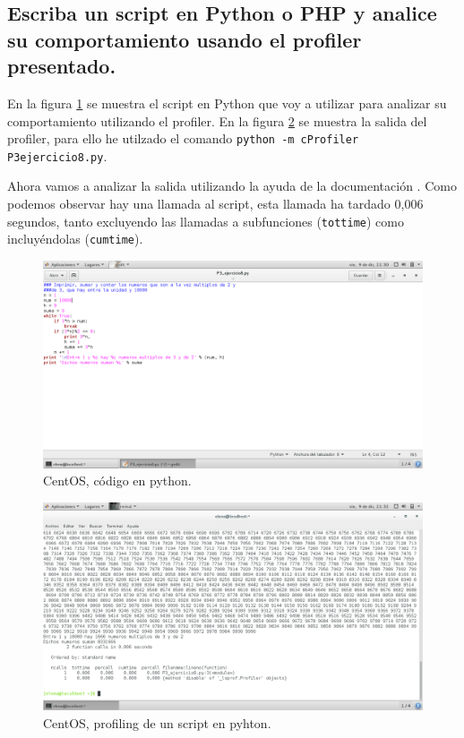\subsection{Escriba un script en Python o PHP y analice su comportamiento usando el profiler presentado.}

En la figura \ref{fig:ejercicio8_1} se muestra el script en Python que voy a utilizar para analizar su comportamiento utilizando el profiler. En la figura \ref{fig:ejercicio8_2} se muestra la salida del profiler, para ello he utilzado el comando \texttt{python -m cProfiler P3ejercicio8.py}.

Ahora vamos a analizar la salida utilizando la ayuda de la documentación \cite{pythonProfiler}. Como podemos observar hay una llamada al script, esta llamada ha tardado 0,006 segundos, tanto excluyendo las llamadas a subfunciones (\texttt{tottime}) como incluyéndolas (\texttt{cumtime}).

\begin{figure}[H] 
	\centering
	\includegraphics[width=14.7cm]{./img/ejercicio8_1.png} 	
	\caption{CentOS, código en python.} \label{fig:ejercicio8_1}
\end{figure}

\begin{figure}[H] 
	\centering
	\includegraphics[width=14.7cm]{./img/ejercicio8_2.png} 	
	\caption{CentOS, profiling de un script en pyhton.} \label{fig:ejercicio8_2}
\end{figure}

